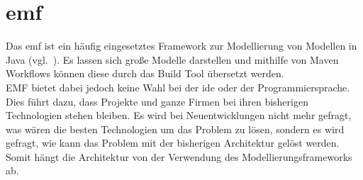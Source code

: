 \documentclass[./einleitung.tex]{subfiles}
\begin{document}
\section{\acrshort{emf}}\label{subsec:emf}
Das \acrfull{emf} ist ein häufig eingesetztes Framework zur Modellierung von Modellen in Java (vgl.~\cite[p. 15]{usageOfMDSD}).
Es lassen sich große Modelle darstellen und mithilfe von Maven Workflows können diese durch das Build Tool übersetzt werden. \\
EMF bietet dabei jedoch keine Wahl bei der \acrshort{ide} oder der Programmiersprache.
Dies führt dazu, dass Projekte und ganze Firmen bei ihren bisherigen Technologien stehen bleiben.
Es wird bei Neuentwicklungen nicht mehr gefragt, was wären die besten Technologien um das Problem zu lösen, sondern es wird gefragt, wie kann das Problem mit der bisherigen Architektur gelöst werden.
Somit hängt die Architektur von der Verwendung des Modellierungsframeworks ab.
\end{document}
